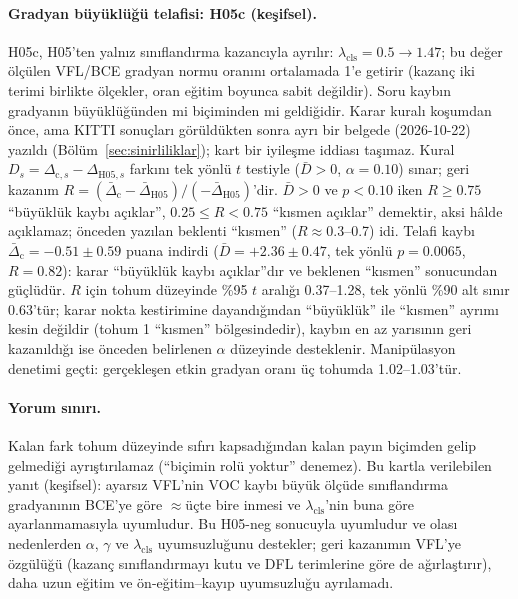 \documentclass[pdflatex,iicol,sn-mathphys-num]{sn-jnl}
\begin{document}
\paragraph{Gradyan büyüklüğü telafisi: H05c (keşifsel).}
H05c, H05'ten yalnız sınıflandırma kazancıyla ayrılır: $\lambda_{\mathrm{cls}}=0.5\to1.47$; bu değer ölçülen VFL/BCE gradyan normu oranını ortalamada 1'e getirir (kazanç iki terimi birlikte ölçekler, oran eğitim boyunca sabit değildir). Soru kaybın gradyanın büyüklüğünden mi biçiminden mi geldiğidir. Karar kuralı koşumdan önce, ama KITTI sonuçları görüldükten sonra ayrı bir belgede (2026-10-22) yazıldı (Bölüm~\ref{sec:sinirliliklar}); kart bir iyileşme iddiası taşımaz. Kural $D_s=\Delta_{\mathrm{c},s}-\Delta_{\mathrm{H05},s}$ farkını tek yönlü $t$ testiyle ($\bar D>0$, $\alpha=0.10$) sınar; geri kazanım $R=(\bar\Delta_{\mathrm{c}}-\bar\Delta_{\mathrm{H05}})/(-\bar\Delta_{\mathrm{H05}})$'dir. $\bar D>0$ ve $p<0.10$ iken $R\ge0.75$ ``büyüklük kaybı açıklar'', $0.25\le R<0.75$ ``kısmen açıklar'' demektir, aksi hâlde açıklamaz; önceden yazılan beklenti ``kısmen'' ($R\approx0.3$--0.7) idi. Telafi kaybı $\bar\Delta_{\mathrm{c}}=-0.51\pm0.59$ puana indirdi ($\bar D=+2.36\pm0.47$, tek yönlü $p=0.0065$, $R=0.82$): karar ``büyüklük kaybı açıklar''dır ve beklenen ``kısmen'' sonucundan güçlüdür. $R$ için tohum düzeyinde \%95 $t$ aralığı 0.37--1.28, tek yönlü \%90 alt sınır 0.63'tür; karar nokta kestirimine dayandığından ``büyüklük'' ile ``kısmen'' ayrımı kesin değildir (tohum 1 ``kısmen'' bölgesindedir), kaybın en az yarısının geri kazanıldığı ise önceden belirlenen $\alpha$ düzeyinde desteklenir. Manipülasyon denetimi geçti: gerçekleşen etkin gradyan oranı üç tohumda 1.02--1.03'tür.

\paragraph{Yorum sınırı.}
Kalan fark tohum düzeyinde sıfırı kapsadığından kalan payın biçimden gelip gelmediği ayrıştırılamaz (``biçimin rolü yoktur'' denemez). Bu kartla verilebilen yanıt (keşifsel): ayarsız VFL'nin VOC kaybı büyük ölçüde sınıflandırma gradyanının BCE'ye göre $\approx$üçte bire inmesi ve $\lambda_{\mathrm{cls}}$'nin buna göre ayarlanmamasıyla uyumludur. Bu H05-neg sonucuyla uyumludur ve olası nedenlerden $\alpha$, $\gamma$ ve $\lambda_{\mathrm{cls}}$ uyumsuzluğunu destekler; geri kazanımın VFL'ye özgülüğü (kazanç sınıflandırmayı kutu ve DFL terimlerine göre de ağırlaştırır), daha uzun eğitim ve ön-eğitim--kayıp uyumsuzluğu ayrılamadı.
\end{document}
